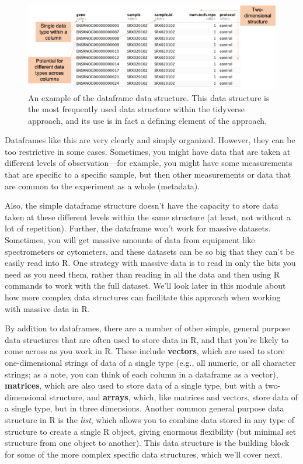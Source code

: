 \documentclass[]{tufte-book}
\begin{document}
\begin{figure}
\includegraphics[width=\textwidth]{figures/dataframe} \caption[An example of the dataframe data structure]{An example of the dataframe data structure. This data structure is the most frequently used data structure within the tidyverse approach, and its use is in fact a defining element of the approach.}\label{fig:dfdatastructure}
\end{figure}

Dataframes like this are very clearly and simply organized. However, they can be
too restrictive in some cases. Sometimes, you might have data that are taken at
different levels of observation---for example, you might have some measurements
that are specific to a specific sample, but then other measurements or data that
are common to the experiment as a whole (metadata).

Also, the simple dataframe structure doesn't have the capacity to store data
taken at these different levels within the same structure (at least, not without
a lot of repetition). Further, the dataframe won't work for massive datasets.
Sometimes, you will get massive amounts of data from equipment like
spectrometers or cytometers, and these datasets can be so big that they can't be
easily read into R. One strategy with massive data is to read in only the bits
you need as you need them, rather than reading in all the data and then
using R commands to work with the full dataset. We'll look later in this module
about how more complex data structures can facilitate this approach when
working with massive data in R.

By addition to dataframes, there are a number of other simple, general purpose
data structures that are often used to store data in R, and that you're likely
to come across as you work in R. These include \textbf{vectors}, which are used to
store one-dimensional strings of data of a single type (e.g., all numeric, or
all character strings; as a note, you can think of each column in a dataframe as
a vector), \textbf{matrices}, which are also used to store data of a single type, but
with a two-dimensional structure, and \textbf{arrays}, which, like matrices and
vectors, store data of a single type, but in three dimensions. Another common
general purpose data structure in R is the \emph{list}, which allows you to combine
data stored in any type of structure to create a single R object, giving
enormous flexibility (but minimal set structure from one object to another).
This data structure is the building block for some of the more complex specific
data structures, which we'll cover next.
\end{document}
